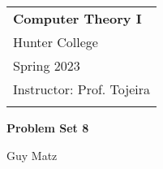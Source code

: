 \documentclass[11pt, a4paper]{article} %
\begin{document}

\setlength{\parindent}{0pt} %
\onehalfspacing				%


\begin{tabular}{p{15.5cm}}
      {\large \textbf{Computer Theory I}} \\
	Hunter College \\
    Spring 2023  \\
	Instructor: Prof. Tojeira\\
	\hline
	\\
\end{tabular}

\vspace*{0.3cm}				%


\begin{center}
	{\Large \textbf{Problem Set 8}}
	\vspace{2mm}

	Guy Matz

\end{center}

\vspace{0.4cm}
\end{document}
